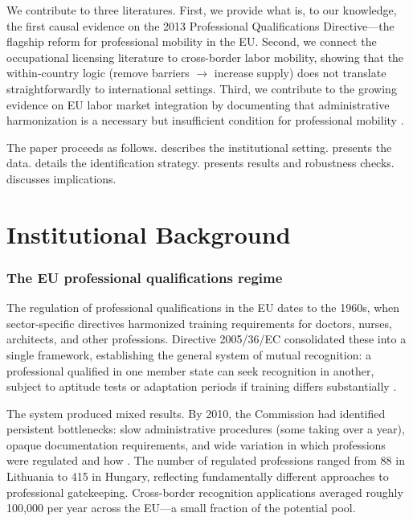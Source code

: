 \documentclass[12pt]{article}
\begin{document}
We contribute to three literatures. First, we provide what is, to our knowledge, the first causal evidence on the 2013 Professional Qualifications Directive---the flagship reform for professional mobility in the EU. Second, we connect the occupational licensing literature \citep{kleiner2000, johnson2018} to cross-border labor mobility, showing that the within-country logic (remove barriers $\rightarrow$ increase supply) does not translate straightforwardly to international settings. Third, we contribute to the growing evidence on EU labor market integration by documenting that administrative harmonization is a necessary but insufficient condition for professional mobility \citep{eurofound2014, geis2019}.

The paper proceeds as follows.  describes the institutional setting.  presents the data.  details the identification strategy.  presents results and robustness checks.  discusses implications.


\section{Institutional Background}\label{sec:background}

\subsubsection*{The EU professional qualifications regime} The regulation of professional qualifications in the EU dates to the 1960s, when sector-specific directives harmonized training requirements for doctors, nurses, architects, and other professions. Directive 2005/36/EC consolidated these into a single framework, establishing the general system of mutual recognition: a professional qualified in one member state can seek recognition in another, subject to aptitude tests or adaptation periods if training differs substantially \citep{eu_directive_2005}.

The system produced mixed results. By 2010, the Commission had identified persistent bottlenecks: slow administrative procedures (some taking over a year), opaque documentation requirements, and wide variation in which professions were regulated and how \citep{ec_green_paper_2011}. The number of regulated professions ranged from 88 in Lithuania to 415 in Hungary, reflecting fundamentally different approaches to professional gatekeeping. Cross-border recognition applications averaged roughly 100,000 per year across the EU---a small fraction of the potential pool.
\end{document}
